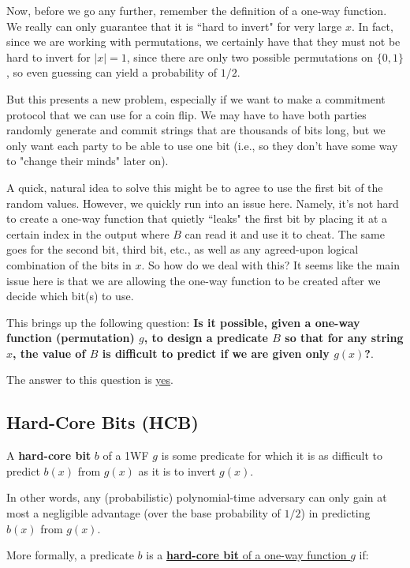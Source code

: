 \documentclass[11pt]{article}
\begin{document}
Now, before we go any further, remember the definition of a one-way function. We really can only guarantee that it is ``hard to invert" for very large \(x\). In fact, since we are working with permutations, we certainly have that they must not be hard to invert for \(|x|=1\), since there are only two possible permutations on \(\{0,1\}\), so even guessing can yield a probability of \(1/2\).\smallskip

But this presents a new problem, especially if we want to make a commitment protocol that we can use for a coin flip. We may have to have both parties randomly generate and commit strings that are thousands of bits long, but we only want each party to be able to use one bit (i.e., so they don't have some way to "change their minds" later on).\medskip

A quick, natural idea to solve this might be to agree to use the first bit of the random values. However, we quickly run into an issue here. Namely, it's not hard to create a one-way function that quietly ``leaks" the first bit by placing it at a certain index in the output where \(B\) can read it and use it to cheat. The same goes for the second bit, third bit, etc., as well as any agreed-upon logical combination of the bits in \(x\). So how do we deal with this? It seems like the main issue here is that we are allowing the one-way function to be created after we decide which bit(s) to use. 

This brings up the following question: \textbf{Is it possible, given a one-way function (permutation) \(g\), to design a predicate \(B\) so that for any string \(x\), the value of \(B\) is difficult to predict if we are given only \(g(x)\)?}. 

The answer to this question is \underline{yes}.


\newpage
\subsection{Hard-Core Bits (HCB)}
A \textbf{hard-core bit} \(b\) of a 1WF \(g\) is some predicate for which it is as difficult to predict \(b(x)\) from \(g(x)\) as it is to invert \(g(x)\). 

In other words, any (probabilistic) polynomial-time adversary can only gain at most a negligible advantage (over the base probability of \(1/2\)) in predicting \(b(x)\) from \(g(x)\).\smallskip

More formally, a predicate \(b\) is a \underline{\textbf{hard-core bit} of a one-way function \(g\)} if:
\end{document}
